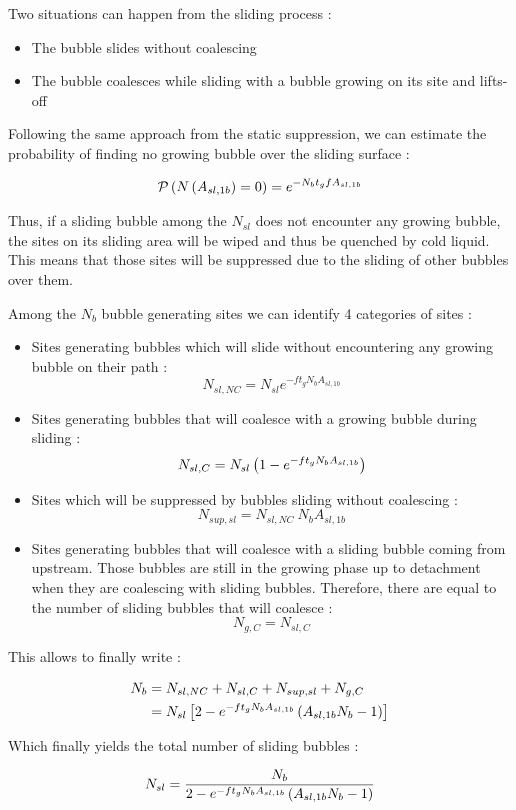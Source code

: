 \npar
Two situations can happen from the sliding process :

\begin{itemize}
\item The bubble slides without coalescing
\item The bubble coalesces while sliding with a bubble growing on its site and lifts-off
\end{itemize}


Following the same approach from the static suppression, we can estimate the probability of finding no growing bubble over the sliding surface : 

\begin{align}
\mathcal{P}\left( N\left( A_{sl,1b} \right)=0  \right)=e^{-N_{b}t_{g}fA_{sl,1b}}
\end{align}

Thus, if a sliding bubble among the $N_{sl}$ does not encounter any growing bubble, the sites on its sliding area will be wiped and thus be quenched by cold liquid. This means that those sites will be suppressed due to the sliding of other bubbles over them.

Among the $N_{b}$ bubble generating sites we can identify 4 categories of sites :

\begin{itemize}
\item Sites generating bubbles which will slide without encountering any growing bubble on their path : $$N_{sl, NC}=N_{sl}e^{-ft_{g}N_{b}A_{sl,1b}}$$

\item Sites generating bubbles that will coalesce with a growing bubble during sliding : 
$$N_{sl, C}=  N_{sl}\left( 1-e^{-ft_{g}N_{b}A_{sl,1b}} \right)$$

\item Sites which will be suppressed by bubbles sliding without coalescing : $$N_{sup, sl}=N_{sl,NC}\ N_{b}A_{sl,1b}$$

\item Sites generating bubbles that will coalesce with a sliding bubble coming from upstream. Those bubbles are still in the growing phase up to detachment when they are coalescing with sliding bubbles. Therefore, there are equal to the number of sliding bubbles that will coalesce : $$N_{g,C}=N_{sl,C}$$

\end{itemize}

This allows to finally write :

\begin{align}
N_{b}&=N_{sl,NC}+N_{sl,C}+N_{sup,sl} + N_{g,C}\\
%
&=N_{sl}\crocht{2-e^{-ft_{g}N_{b}A_{sl,1b}}\parth{A_{sl,1b}N_{b}-1}}
\end{align}

Which finally yields the total number of sliding bubbles : 

\begin{align}
N_{sl}=\frac{N_{b}}{2-e^{-ft_{g}N_{b}A_{sl,1b}}\left( A_{sl,1b}N_{b}-1 \right)}
\end{align}